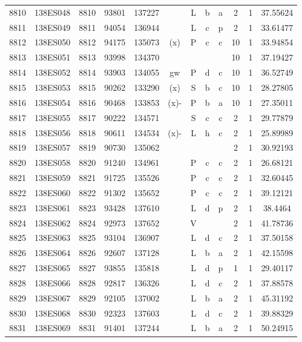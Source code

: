 \begin{tabular}{|*{12}{c|}}
8810 & 138ES048 & 8810 & 93801 & 137227 &  & L & b & a & 2 & 1 & 37.55624 \\ 
8811 & 138ES049 & 8811 & 94054 & 136944 &  & L & c & p & 2 & 1 & 33.61477 \\ 
8812 & 138ES050 & 8812 & 94175 & 135073 & (x) & P & c & c & 10 & 1 & 33.94854 \\ 
8813 & 138ES051 & 8813 & 93998 & 134370 &  &  &  &  & 10 & 1 & 37.19427 \\ 
8814 & 138ES052 & 8814 & 93903 & 134055 & gw & P & d & c & 10 & 1 & 36.52749 \\ 
8815 & 138ES053 & 8815 & 90262 & 133290 & (x) & S & b & c & 10 & 1 & 28.27805 \\ 
8816 & 138ES054 & 8816 & 90468 & 133853 & (x)- & P & b & a & 10 & 1 & 27.35011 \\ 
8817 & 138ES055 & 8817 & 90222 & 134571 &  & S & c & c & 2 & 1 & 29.77879 \\ 
8818 & 138ES056 & 8818 & 90611 & 134534 & (x)- & L & h & c & 2 & 1 & 25.89989 \\ 
8819 & 138ES057 & 8819 & 90730 & 135062 &  &  &  &  & 2 & 1 & 30.92193 \\ 
8820 & 138ES058 & 8820 & 91240 & 134961 &  & P & c & c & 2 & 1 & 26.68121 \\ 
8821 & 138ES059 & 8821 & 91725 & 135526 &  & P & c & c & 2 & 1 & 32.60445 \\ 
8822 & 138ES060 & 8822 & 91302 & 135652 &  & P & c & c & 2 & 1 & 39.12121 \\ 
8823 & 138ES061 & 8823 & 93428 & 137610 &  & L & d & p & 2 & 1 & 38.4464 \\ 
8824 & 138ES062 & 8824 & 92973 & 137652 &  & V &  &  & 2 & 1 & 41.78736 \\ 
8825 & 138ES063 & 8825 & 93104 & 136907 &  & L & d & c & 2 & 1 & 37.50158 \\ 
8826 & 138ES064 & 8826 & 92607 & 137128 &  & L & b & a & 2 & 1 & 42.15598 \\ 
8827 & 138ES065 & 8827 & 93855 & 135818 &  & L & d & p & 1 & 1 & 29.40117 \\ 
8828 & 138ES066 & 8828 & 92817 & 136326 &  & L & d & c & 2 & 1 & 37.88578 \\ 
8829 & 138ES067 & 8829 & 92105 & 137002 &  & L & b & a & 2 & 1 & 45.31192 \\ 
8830 & 138ES068 & 8830 & 92323 & 137603 &  & L & d & c & 2 & 1 & 39.88329 \\ 
8831 & 138ES069 & 8831 & 91401 & 137244 &  & L & b & a & 2 & 1 & 50.24915 \\ 

\end{tabular}
